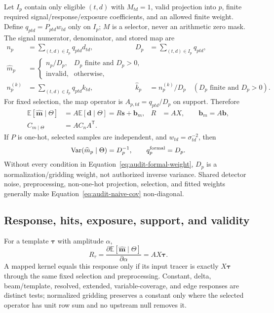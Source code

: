 \documentclass[11pt]{article}
\newcommand{\E}{\mathbb{E}}
\newcommand{\Var}{\operatorname{Var}}
\begin{document}
Let \(I_p\) contain only eligible \((t,d)\) with \(M_{td}=1\), valid projection
into \(p\), finite required signal/response/exposure coefficients, and an
allowed finite weight.  Define \(q_{ptd}=P_{ptd}w_{td}\) only on \(I_p\);
\(M\) is a selector, never an arithmetic zero mask.  The signal numerator,
denominator, and stored map are
\begin{align}
 n_p &= \sum_{(t,d)\in I_p}q_{ptd}d_{td},
 & D_p &= \sum_{(t,d)\in I_p}q_{ptd},
 \label{eq:audit-naive-num}\\
 \widehat m_p &= \begin{cases}n_p/D_p,&D_p\text{ finite and }D_p>0,\\
                              \text{invalid},&\text{otherwise},
                 \end{cases}
 \label{eq:audit-naive-map}\\
 n^{(k)}_p &= \sum_{(t,d)\in I_p}q_{ptd}k_{td},
 & \widehat k_p &= n^{(k)}_p/D_p
      \quad(D_p\text{ finite and }D_p>0).
 \label{eq:audit-kernel}
\end{align}
For fixed selection, the map operator is
\(A_{p,td}=q_{ptd}/D_p\) on support.  Therefore
\begin{align}
  \E[\widehat{\boldsymbol m}\mid\Theta]
    &=A\E[\boldsymbol d\mid\Theta]
      =R\boldsymbol s+\boldsymbol b_m,
  &R&=AX,\qquad \boldsymbol b_m=A\boldsymbol b,
  \label{eq:audit-response}\\
  C_{m\mid\Theta}&=A C_n A^{\mathsf T}.
  \label{eq:audit-naive-cov}
\end{align}
If \(P\) is one-hot, selected samples are independent, and
\(w_{td}=\sigma_{td}^{-2}\), then
\begin{equation}
  \Var(\widehat m_p\mid\Theta)=D_p^{-1},\qquad
  q^{\rm formal}_p=D_p.
  \label{eq:audit-formal-weight}
\end{equation}
Without every condition in Equation~\eqref{eq:audit-formal-weight}, \(D_p\) is
a normalization/gridding weight, not authorized inverse variance.  Shared
detector noise, preprocessing, non-one-hot projection, selection, and fitted
weights generally make Equation~\eqref{eq:audit-naive-cov} non-diagonal.

\subsection{Response, hits, exposure, support, and validity}

For a template \(\boldsymbol\tau\) with amplitude \(\alpha\),
\begin{equation}
 R_{\tau}=\frac{\partial\E[\widehat{\boldsymbol m}\mid\Theta]}
                 {\partial\alpha}=AX\boldsymbol\tau.
 \label{eq:audit-template-response}
\end{equation}
A mapped kernel equals this response only if its input tracer is exactly
\(X\boldsymbol\tau\) through the same fixed selection and preprocessing.
Constant, delta, beam/template, resolved, extended, variable-coverage, and edge
responses are distinct tests; normalized gridding preserves a constant only
where the selected operator has unit row sum and no upstream null removes it.
\end{document}
